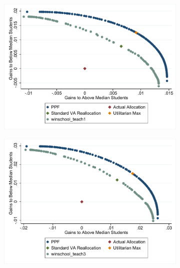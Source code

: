 \documentclass[12pt]{article}
\theoremstyle{definition}
\theoremstyle{definition}
\theoremstyle{definition}
\theoremstyle{definition}
\begin{document}
\begin{figure}[H]
    \centering
    
    \begin{subfigure}[b]{0.45\textwidth}
        \includegraphics[width=1\textwidth]{Working_Paper/WP_Figures/WithinSchoolReallocationELAandStVA.pdf}
    \end{subfigure}
    \begin{subfigure}[b]{0.45\textwidth}
        \includegraphics[width=1\textwidth]{Working_Paper/WP_Figures/WithinSchoolReallocationMathandStVA.pdf}
    \end{subfigure}

\end{figure}
\end{document}
